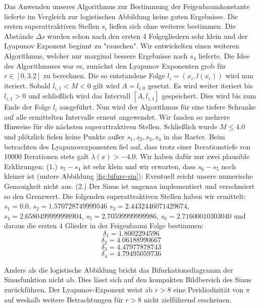 \documentclass[12pt,a4paper]{article}
\begin{document}
Das Anwenden unseres Algorithmus zur Bestimmung der Feigenbaumkonstante lieferte im Vergleich zur logistischen Abbildung keine guten Ergebnisse. Die ersten superattraktiven Stellen $s_i$ ließen sich ohne weiteres bestimmen. Die Abstände $\Delta s$ wurden schon nach den ersten 4 Folgegliedern sehr klein und der Lyapunov Exponent beginnt zu "rauschen". 
Wir entwickelten einen weiteren Algorithmus, welcher nur marginal bessere Ergebnisse nach $s_4$ lieferte. Die Idee des Algorithmuses war es, zunächst den Lyapunov Exponenten grob für $r\in [0,3.2]$ zu berechnen. 
Die so entstandene Folge $l_i=(x_i, l(x_i))$ wird nun iteriert. Sobald $l_{i,1} < M < 0$ gilt wird $A=l_{i,0}$ gesetzt. Es wird weiter iteriert bis $l_{i,1} > 0$ und schließlich wird das Intervall $[A, l_{i,1}]$ gespeichert. Dies wird bis zum Ende der Folge $l_i$ ausgeführt. 
Nun wird der Algorithmus für eine tiefere Schranke auf alle ermittelten Intervalle erneut angewendet. 
Wir fanden so mehrere Hinweise für die nächsten superattraktiven Stellen. 
Schließlich wurde $M \leq 4.0$ und plötzlich fielen keine Punkte außer $s_1, s_2, s_3, s_4$ in das Raster. Beim betrachten des Lyapunovexponenten fiel auf, dass trotz einer Iterationstiefe von 10000 Iterationen stets galt $\lambda(x)>-4.0$. 
Wir haben dafür nur zwei plausible Erklärungen: 
(1.) $s_5-s_4$ ist sehr klein und wir erwarten, dass $s_6-s_5$ noch kleiner ist (untere Abbildung \ref{fig:bifurc-sin}): Eventuell reicht unsere numerische Genauigkeit nicht aus. 
(2.) Der Sinus ist ungenau implementiert und verschmiert so den Grenzwert. 
Die folgenden superattraktiven Stellen haben wir ermittelt: $s_1=0.0$, $s_2=1.570728749999546$ $s_3=2.4432446071429674$, $s_4=2.6580499999998904$, $s_5=2.70599999999986$, $s_6=2.71600010303040$ und daraus die ersten 4 Glieder in der Feigenbaum Folge bestimmen:
$$\delta_1=1.8002294596$$
$$\delta_2=4.06188990667$$
$$\delta_3=4.47977878743$$
$$\delta_4=4.79495059736$$

Anders als die logistische Abbildung bricht das Bifurkationsdiagramm der Sinusfunktion nicht ab. Dies lässt sich auf den kompakten Bildbereich des Sinus zurückführen. Der Lyapunov-Exponent weist ab $r>8$ eine Peridiodizität von $\pi$ auf weshalb weitere Betrachtungen für $r>8$ nicht zielführend erscheinen.
\end{document}
